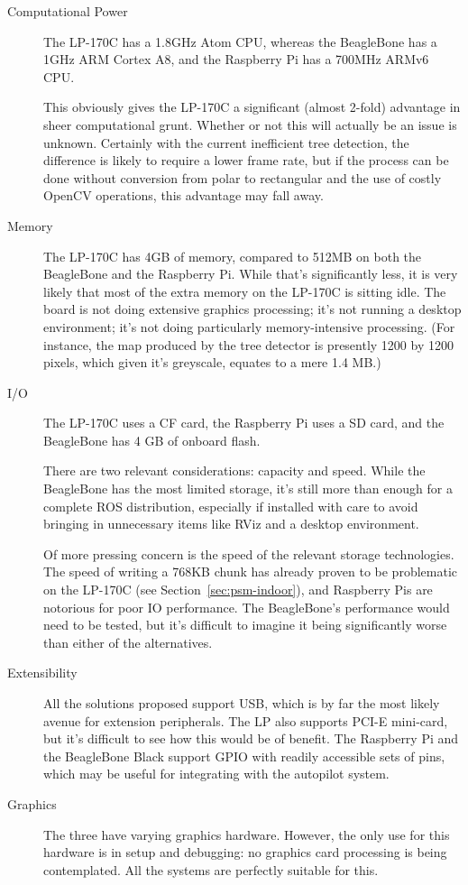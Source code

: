 \documentclass[12pt,oneside,a4paper]{book}
\begin{document}
\begin{description}
\item[Computational Power] The LP-170C has a 1.8GHz Atom CPU, whereas
  the BeagleBone has a 1GHz ARM Cortex A8, and the Raspberry Pi has a
  700MHz ARMv6 CPU.

  This obviously gives the LP-170C a significant (almost 2-fold)
  advantage in sheer computational grunt. Whether or not this will
  actually be an issue is unknown. Certainly with the current
  inefficient tree detection, the difference is likely to require a
  lower frame rate, but if the process can be done without conversion
  from polar to rectangular and the use of costly OpenCV operations,
  this advantage may fall away.
\item[Memory] The LP-170C has 4GB of memory, compared to 512MB on both
  the BeagleBone and the Raspberry Pi. While that's significantly
  less, it is very likely that most of the extra memory on the LP-170C is sitting
  idle. The board is not doing extensive graphics processing; it's not
  running a desktop environment; it's not doing particularly
  memory-intensive processing. (For instance, the map produced by the
  tree detector is presently 1200 by 1200 pixels, which given it's
  greyscale, equates to a mere 1.4 MB.)
\item[I/O] The LP-170C uses a CF card, the Raspberry Pi uses a SD
  card, and the BeagleBone has 4 GB of onboard flash.

  There are two relevant considerations: capacity and speed. While the
  BeagleBone has the most limited storage, it's still more than enough
  for a complete ROS distribution, especially if installed with care
  to avoid bringing in unnecessary items like RViz and a desktop
  environment.

  Of more pressing concern is the speed of the relevant storage
  technologies. The speed of writing a 768KB chunk has already proven
  to be problematic on the LP-170C (see Section~\ref{sec:psm-indoor}),
  and Raspberry Pis are notorious for poor IO performance. The
  BeagleBone's performance would need to be tested, but it's difficult
  to imagine it being significantly worse than either of the
  alternatives.
\item[Extensibility] All the solutions proposed support USB, which is
  by far the most likely avenue for extension peripherals. The LP also
  supports PCI-E mini-card, but it's difficult to see how this would
  be of benefit. The Raspberry Pi and the BeagleBone Black support
  GPIO with readily accessible sets of pins, which may be useful for
  integrating with the autopilot system.
\item[Graphics] The three have varying graphics hardware. However, the
  only use for this hardware is in setup and debugging: no graphics
  card processing is being contemplated. All the systems are perfectly
  suitable for this.
\end{description}
\end{document}
